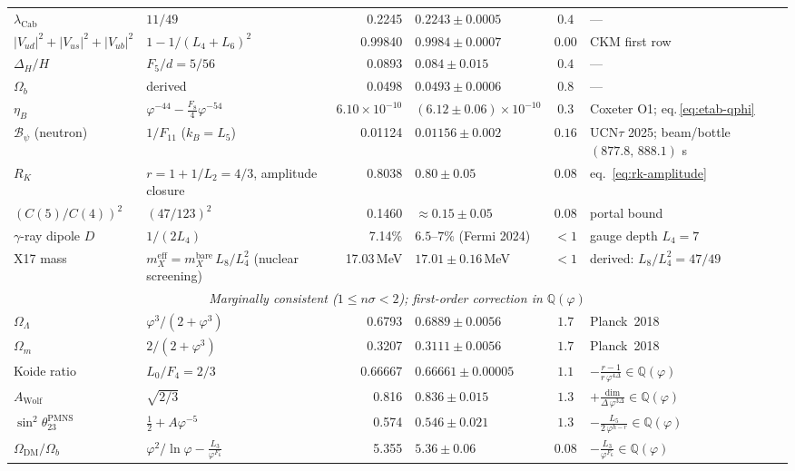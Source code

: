 \documentclass[12pt,a4paper]{article}
\begin{document}
\begin{center}
\begin{tabular}{|l|p{2.1cm}|r|p{2.2cm}|c|p{1.85cm}|}
$\lambda_{\mathrm{Cab}}$ & $11/49$ & 0.2245 & $0.2243 \pm 0.0005$ & $0.4$ & --- \\
$|V_{ud}|^2 {+} |V_{us}|^2 {+} |V_{ub}|^2$ & $1 - 1/(L_4{+}L_6)^2$ & 0.99840 & $0.9984 \pm 0.0007$ & $0.00$ & CKM first row \\
$\Delta_H/H$ & $F_5/d = 5/56$ & 0.0893 & $0.084 \pm 0.015$ & $0.4$ & --- \\
$\Omega_b$ & derived & 0.0498 & $0.0493 \pm 0.0006$ & $0.8$ & --- \\
$\eta_B$ & $\varphi^{-44}{-}\tfrac{F_8}{4}\varphi^{-54}$ & $6.10{\times}10^{-10}$ & $(6.12 \pm 0.06){\times}10^{-10}$ & $0.3$ & Coxeter O1; eq.\,\eqref{eq:etab-qphi} \\
$\mathcal{B}_\psi$ (neutron) & $1/F_{11}$ ($k_B = L_5$) & 0.01124 & $0.01156 \pm 0.002$ & $0.16$ & UCN$\tau$ 2025; beam/bottle $(877.8,\,888.1)$ s \\
$R_K$ & $r = 1{+}1/L_2 = 4/3$, amplitude closure & 0.8038 & $0.80 \pm 0.05$ & $0.08$ & eq.~\eqref{eq:rk-amplitude} \\
$(C(5)/C(4))^2$ & $(47/123)^2$ & 0.1460 & $\approx 0.15 \pm 0.05$ & $0.08$ & portal bound \\
$\gamma$-ray dipole $D$ & $1/(2L_4)$ & 7.14\% & $6.5$--$7\%$ (Fermi 2024) & $<1$ & gauge depth $L_4{=}7$ \\
X17 mass & $m_X^{\mathrm{eff}}=m_X^{\mathrm{bare}}\,L_8/L_4^2$ (nuclear screening) & 17.03\,MeV & $17.01 \pm 0.16$\,MeV & $<1$ & derived: $L_8/L_4^2=47/49$ \\
\hline
\multicolumn{6}{|c|}{\textit{Marginally consistent ($1 \leq n\sigma < 2$); first-order correction in $\mathbb{Q}(\varphi)$}} \\
\hline
$\Omega_\Lambda$ & $\varphi^3/(2{+}\varphi^3)$ & 0.6793 & $0.6889 \pm 0.0056$ & $1.7$ & Planck~2018 \\
$\Omega_m$ & $2/(2{+}\varphi^3)$ & 0.3207 & $0.3111 \pm 0.0056$ & $1.7$ & Planck~2018 \\
Koide ratio & $L_0/F_4 = 2/3$ & 0.66667 & $0.66661 \pm 0.00005$ & $1.1$ & $-\frac{r{-}1}{r\,\varphi^{4\Delta}} \in \mathbb{Q}(\varphi)$ \\
$A_{\mathrm{Wolf}}$ & $\sqrt{2/3}$ & 0.816 & $0.836 \pm 0.015$ & $1.3$ & $+\frac{\mathrm{dim}}{\Delta\,\varphi^{3\Delta}} \in \mathbb{Q}(\varphi)$ \\
$\sin^2\theta_{23}^{\mathrm{PMNS}}$ & $\frac{1}{2}+A\varphi^{-5}$ & 0.574 & $0.546 \pm 0.021$ & $1.3$ & $-\frac{L_5}{2\,\varphi^{h-r}} \in \mathbb{Q}(\varphi)$ \\
$\Omega_{\mathrm{DM}}/\Omega_b$ & $\varphi^2/\ln\varphi{-}\tfrac{L_3}{\varphi^{F_6}}$ & 5.355 & $5.36 \pm 0.06$ & $0.08$ & $-\frac{L_3}{\varphi^{F_6}} \in \mathbb{Q}(\varphi)$ \\

\end{tabular}
\end{center}
\end{document}
